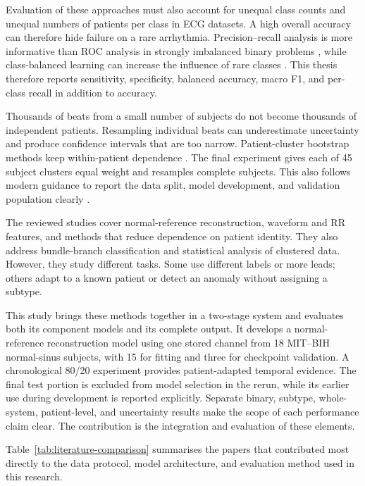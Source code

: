 Evaluation of these approaches must also account for unequal class counts
and unequal numbers of patients per class in ECG datasets. A high overall accuracy can therefore hide failure on a rare arrhythmia.
Precision--recall analysis is more informative than ROC analysis in strongly
imbalanced binary problems \cite{saito2015pr}, while class-balanced learning can
increase the influence of rare classes \cite{cui2019classbalanced}. This thesis
therefore reports sensitivity, specificity, balanced accuracy, macro F1, and
per-class recall in addition to accuracy.

Thousands of beats from a small number of subjects do not become thousands of
independent patients. Resampling individual beats can underestimate uncertainty and produce
confidence intervals that are too narrow. Patient-cluster bootstrap methods keep
within-patient dependence \cite{rutter2000clustered}. The final experiment gives
each of 45 subject clusters equal weight and resamples complete subjects. This
also follows modern guidance to report the data split, model development, and
validation population clearly \cite{collins2024tripodai}.

The reviewed studies cover normal-reference reconstruction, waveform and RR
features, and methods that reduce dependence on patient identity. They also
address bundle-branch classification and statistical analysis of clustered
data. However, they study different tasks. Some use different labels or more
leads; others adapt to a known patient or detect an anomaly without assigning
a subtype.

This study brings these methods together in a two-stage system and evaluates
both its component models and its complete output. It develops a normal-reference
reconstruction model using one stored channel from 18 MIT--BIH normal-sinus
subjects, with 15 for fitting and three for checkpoint validation. A
chronological 80/20 experiment provides patient-adapted temporal evidence.
The final test portion is excluded from model selection in the rerun, while
its earlier use during development is reported explicitly. Separate binary,
subtype, whole-system, patient-level, and uncertainty results make the scope
of each performance claim clear. The contribution is the integration and
evaluation of these elements.

Table~\ref{tab:literature-comparison} summarises the papers that contributed most
directly to the data protocol, model architecture, and evaluation method used in
this research.

